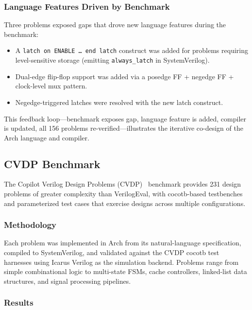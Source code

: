 \documentclass[11pt,twocolumn]{article}
\begin{document}
\subsubsection{Language Features Driven by Benchmark}

Three problems exposed gaps that drove new language features during the benchmark:

\begin{itemize}
\item A \texttt{latch on ENABLE \ldots\ end latch} construct was added for problems requiring level-sensitive storage (emitting \texttt{always\_latch} in SystemVerilog).
\item Dual-edge flip-flop support was added via a posedge FF + negedge FF + clock-level mux pattern.
\item Negedge-triggered latches were resolved with the new latch construct.
\end{itemize}

This feedback loop---benchmark exposes gap, language feature is added, compiler is updated, all 156 problems re-verified---illustrates the iterative co-design of the Arch language and compiler.

\subsection{CVDP Benchmark}\label{sec:cvdp}

The Copilot Verilog Design Problems (CVDP)~\cite{cvdp} benchmark provides 231 design problems of greater complexity than VerilogEval, with cocotb-based testbenches and parameterized test cases that exercise designs across multiple configurations.

\subsubsection{Methodology}

Each problem was implemented in Arch from its natural-language specification, compiled to SystemVerilog, and validated against the CVDP cocotb test harnesses using Icarus Verilog as the simulation backend. Problems range from simple combinational logic to multi-state FSMs, cache controllers, linked-list data structures, and signal processing pipelines.

\subsubsection{Results}
\end{document}

